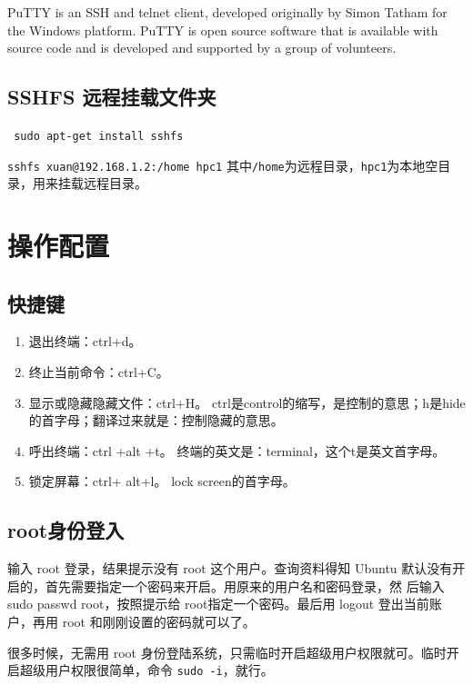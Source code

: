 {PuTTY is an SSH and telnet client, developed originally by Simon Tatham for the Windows platform. PuTTY is open source software that is available with source code and is developed and supported by a group of volunteers.


\section{SSHFS 远程挂载文件夹}
\verb| sudo apt-get install sshfs|

\verb*|sshfs xuan@192.168.1.2:/home hpc1|
其中\verb|/home|为远程目录，\verb|hpc1|为本地空目录，用来挂载远程目录。





\chapter{操作配置}
\section{快捷键}
\begin{enumerate}
\item 退出终端：ctrl+d。

\item 终止当前命令：ctrl+C。

\item 显示或隐藏隐藏文件：ctrl+H。 ctrl是control的缩写，是控制的意思；h是hide的首字母；翻译过来就是：控制隐藏的意思。

\item 呼出终端：ctrl +alt +t。 终端的英文是：terminal，这个t是英文首字母。

\item 锁定屏幕：ctrl+ alt+l。 lock screen的首字母。
\end{enumerate}



\section{root身份登入}
输入 root 登录，结果提示没有 root 这个用户。查询资料得知 Ubuntu 默认没有开启的，首先需要指定一个密码来开启。用原来的用户名和密码登录，然 后输入sudo passwd root，按照提示给 root指定一个密码。最后用 logout 登出当前账户，再用 root 和刚刚设置的密码就可以了。

很多时候，无需用 root 身份登陆系统，只需临时开启超级用户权限就可。临时开启超级用户权限很简单，命令 \verb*|sudo -i|，就行。



}

